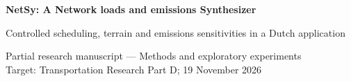 \begin{center}
{\Large\bfseries NetSy: A Network loads and emissions Synthesizer\par}
\medskip
{\large Controlled scheduling, terrain and emissions sensitivities in a Dutch application\par}
\medskip
{\small Partial research manuscript --- Methods and exploratory experiments\\
Target: Transportation Research Part D; 19 November 2026}
\end{center}
